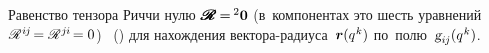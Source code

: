 \begin{otherlanguage}{russian}
Равенство тензора Риччи нулю
${\hspace{.1ex}\pmb{\scalebox{1.2}[1]{$\mathscr{R}$}} \hspace{-0.16ex} = \hspace{-0.2ex} {^2\bm{0}}}$ (в~компонентах это шесть уравнений ${\hspace{.1ex}\mathscr{R}^{\hspace{.1ex}i\hspace{-0.1ex}j} \hspace{-0.3ex} = \mathscr{R}^{\hspace{.1ex}j\hspace{-0.06ex}i} \hspace{-0.3ex} = 0}$)  \textcolor{magenta}{}  ~() для нахождения вектора-радиуса~${\bm{r}(q^{\hspace{.1ex}k})}$ по~полю~${\textsl{g}_{i\hspace{-0.1ex}j}(q^{\hspace{.1ex}k})}$.

\end{otherlanguage}

